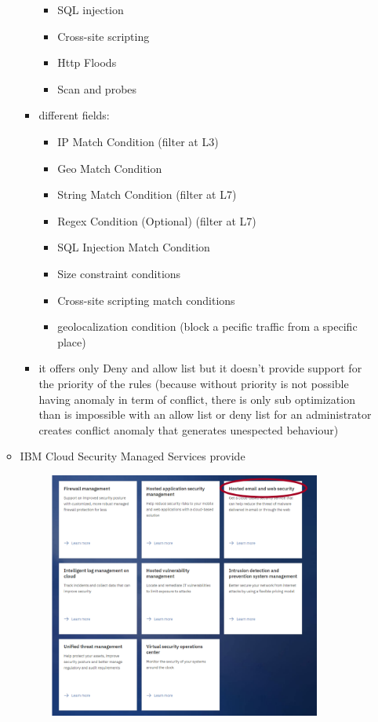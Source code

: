 \documentclass{article}
\begin{document}
\begin{itemize}
\begin{itemize}
\begin{itemize}
\begin{itemize}
                \item SQL injection 
                \item Cross-site scripting 
                \item Http Floods
                \item Scan and probes
            \end{itemize}
            \item different fields:
            \begin{itemize}
                \item IP Match Condition (filter at L3)
                \item Geo Match Condition
                \item String Match Condition (filter at L7)
                \item Regex Condition (Optional) (filter at L7)
                \item SQL Injection Match Condition
                \item Size constraint conditions
                \item Cross-site scripting match conditions
                \item geolocalization condition (block a pecific traffic from a specific place)
            \end{itemize}
            \item it offers only Deny and allow list but it doesn't provide support for the priority of the rules (because without priority is not possible having anomaly in term of conflict, there is only sub optimization than is impossible with an allow list or deny list for an administrator creates conflict anomaly that generates unespected behaviour)
        \end{itemize}
        \item IBM Cloud Security Managed Services provide
        \begin{itemize}
            \begin{figure}[h]
                \centering
                \includegraphics[width=0.90\textwidth]{figure/IBM_cloud_security_managed.png}

\end{figure}
\end{itemize}
\end{itemize}
\end{itemize}
\end{document}

